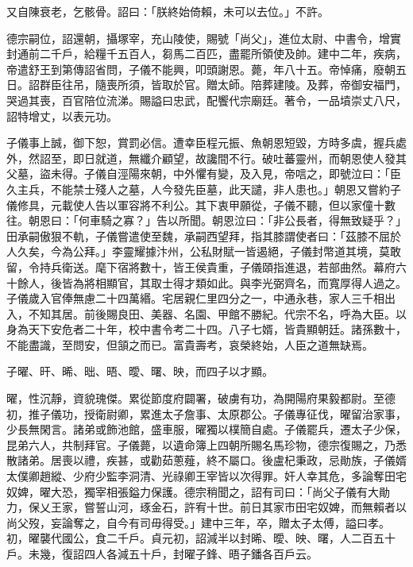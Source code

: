 \begin{pinyinscope}
 又自陳衰老，乞骸骨。詔曰：「朕終始倚賴，未可以去位。」不許。



 德宗嗣位，詔還朝，攝塚宰，充山陵使，賜號「尚父」，進位太尉、中書令，增實封通前二千戶，給糧千五百人，芻馬二百匹，盡罷所領使及帥。建中二年，疾病，帝遣舒王到第傳詔省問，子儀不能興，叩頭謝恩。薨，年八十五。帝悼痛，廢朝五日。詔群臣往吊，隨喪所須，皆取於官。贈太師。陪葬建陵。及葬，帝御安福門，哭過其喪，百官陪位流涕。賜謚曰忠武，配饗代宗廟廷。著令，一品墳崇丈八尺，詔特增丈，以表元功。



 子儀事上誠，御下恕，賞罰必信。遭幸臣程元振、魚朝恩短毀，方時多虞，握兵處外，然詔至，即日就道，無纖介顧望，故讒間不行。破吐蕃靈州，而朝恩使人發其父墓，盜未得。子儀自涇陽來朝，中外懼有變，及入見，帝唁之，即號泣曰：「臣久主兵，不能禁士殘人之墓，人今發先臣墓，此天譴，非人患也。」朝恩又嘗約子儀修具，元載使人告以軍容將不利公。其下衷甲願從，子儀不聽，但以家僮十數往。朝恩曰：「何車騎之寡？」告以所聞。朝恩泣曰：「非公長者，得無致疑乎？」田承嗣傲狠不軌，子儀嘗遣使至魏，承嗣西望拜，指其膝謂使者曰：「茲膝不屈於人久矣，今為公拜。」李靈耀據汴州，公私財賦一皆遏絕，子儀封幣道其境，莫敢留，令持兵衛送。麾下宿將數十，皆王侯貴重，子儀頤指進退，若部曲然。幕府六十餘人，後皆為將相顯官，其取士得才類如此。與李光弼齊名，而寬厚得人過之。子儀歲入官俸無慮二十四萬緡。宅居親仁里四分之一，中通永巷，家人三千相出入，不知其居。前後賜良田、美器、名園、甲館不勝紀。代宗不名，呼為大臣。以身為天下安危者二十年，校中書令考二十四。八子七婿，皆貴顯朝廷。諸孫數十，不能盡識，至問安，但頷之而已。富貴壽考，哀榮終始，人臣之道無缺焉。



 子曜、旰、晞、昢、晤、曖、曙、映，而四子以才顯。



 曜，性沉靜，資貌瑰傑。累從節度府闢署，破虜有功，為開陽府果毅都尉。至德初，推子儀功，授衛尉卿，累進太子詹事、太原郡公。子儀專征伐，曜留治家事，少長無閑言。諸弟或飾池館，盛車服，曜獨以樸簡自處。子儀罷兵，遷太子少保，昆弟六人，共制拜官。子儀薨，以遺命簿上四朝所賜名馬珍物，德宗復賜之，乃悉散諸弟。居喪以禮，疾甚，或勸茹蔥薤，終不屬口。後盧杞秉政，忌勛族，子儀婿太僕卿趙縱、少府少監李洞清、光祿卿王宰皆以次得罪。奸人幸其危，多論奪田宅奴婢，曜大恐，獨宰相張鎰力保護。德宗稍聞之，詔有司曰：「尚父子儀有大勛力，保乂王家，嘗誓山河，琢金石，許宥十世。前日其家市田宅奴婢，而無賴者以尚父歿，妄論奪之，自今有司毋得受。」建中三年，卒，贈太子太傅，謚曰孝。初，曜襲代國公，食二千戶。貞元初，詔減半以封晞、曖、映、曙，人二百五十戶。未幾，復詔四人各減五十戶，封曜子鋒、晤子鐇各百戶云。




\end{pinyinscope}
